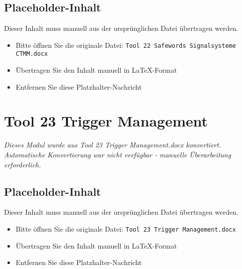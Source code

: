 
\subsection{Placeholder-Inhalt}

Dieser Inhalt muss manuell aus der ursprünglichen Datei übertragen werden.

\begin{itemize}
\item Bitte öffnen Sie die originale Datei: \texttt{Tool 22 Safewords Signalsysteme CTMM.docx}
\item Übertragen Sie den Inhalt manuell in LaTeX-Format
\item Entfernen Sie diese Platzhalter-Nachricht
\end{itemize}




\section{Tool 23 Trigger Management}
\label{sec:tool-23-trigger-management}

\begin{center}
\textit{Dieses Modul wurde aus Tool 23 Trigger Management.docx konvertiert.\\
Automatische Konvertierung war nicht verfügbar - manuelle Überarbeitung erforderlich.}
\end{center}


\subsection{Placeholder-Inhalt}

Dieser Inhalt muss manuell aus der ursprünglichen Datei übertragen werden.

\begin{itemize}
\item Bitte öffnen Sie die originale Datei: \texttt{Tool 23 Trigger Management.docx}
\item Übertragen Sie den Inhalt manuell in LaTeX-Format
\item Entfernen Sie diese Platzhalter-Nachricht
\end{itemize}


